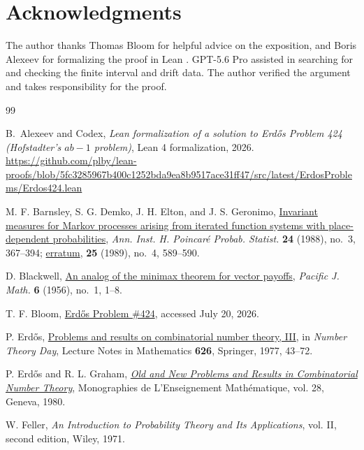\documentclass[11pt]{article}
\begin{document}
\section*{Acknowledgments}

The author thanks Thomas Bloom for helpful advice on the exposition, and Boris Alexeev for formalizing the proof in Lean \cite{AlexeevCodexErdos424}. GPT-5.6 Pro assisted in searching for and checking the finite interval and drift data. The author verified the argument and takes responsibility for the proof.

\begin{thebibliography}{99}

B.~Alexeev and Codex,
\emph{Lean formalization of a solution to Erd\H{o}s Problem 424
(Hofstadter's $ab-1$ problem)},
Lean 4 formalization, 2026.
\url{https://github.com/plby/lean-proofs/blob/5fc3285967b400c1252bda9ea8b9517ace31ff47/src/latest/ErdosProblems/Erdos424.lean}

M. F. Barnsley, S. G. Demko, J. H. Elton, and J. S. Geronimo,
\href{https://eudml.org/doc/77331}
{Invariant measures for Markov processes arising from iterated function
systems with place-dependent probabilities},
\emph{Ann. Inst. H. Poincar\'e Probab. Statist.}
\textbf{24} (1988), no.~3, 367--394;
\href{https://eudml.org/doc/77366}{erratum},
\textbf{25} (1989), no.~4, 589--590.

D. Blackwell,
\href{https://doi.org/10.2140/pjm.1956.6.1}
{An analog of the minimax theorem for vector payoffs},
\emph{Pacific J. Math.}
\textbf{6} (1956), no.~1, 1--8.

 T. F. Bloom, \href{https://www.erdosproblems.com/424}{Erd\H{o}s Problem \#424}, accessed July 20, 2026.

 P. Erd\H{o}s, \href{https://www.renyi.hu/~p_erdos/1977-27.pdf}{Problems and results on combinatorial number theory, III}, in \emph{Number Theory Day}, Lecture Notes in Mathematics \textbf{626}, Springer, 1977, 43--72.

 P. Erd\H{o}s and R. L. Graham, \href{https://mathweb.ucsd.edu/~ronspubs/80_11_number_theory.pdf}{\emph{Old and New Problems and Results in Combinatorial Number Theory}}, Monographies de L'Enseignement Math\'ematique, vol. 28, Geneva, 1980.

 W. Feller, \emph{An Introduction to Probability Theory and Its Applications}, vol. II, second edition, Wiley, 1971.


\end{thebibliography}
\end{document}
